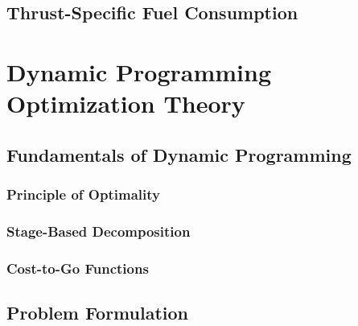 \documentclass[12pt, a4paper]{report}
\begin{document}
\subsection{Thrust-Specific Fuel Consumption}
\label{sec:thrust_specific_fuel_consumption}

 

\section{Dynamic Programming Optimization Theory}
\label{sec:dp_optimization_theory}


\subsection{Fundamentals of Dynamic Programming}
\label{sec:dp_fundamentals}



\subsubsection{Principle of Optimality}
\label{sssec:principle_of_optimality}



\subsubsection{Stage-Based Decomposition}
\label{sssec:stage_based_decomposition}


\subsubsection{Cost-to-Go Functions}
\label{sssec:cost_to_go_functions}



\subsection{Problem Formulation}
\label{sec:problem_formulation}

\end{document}
